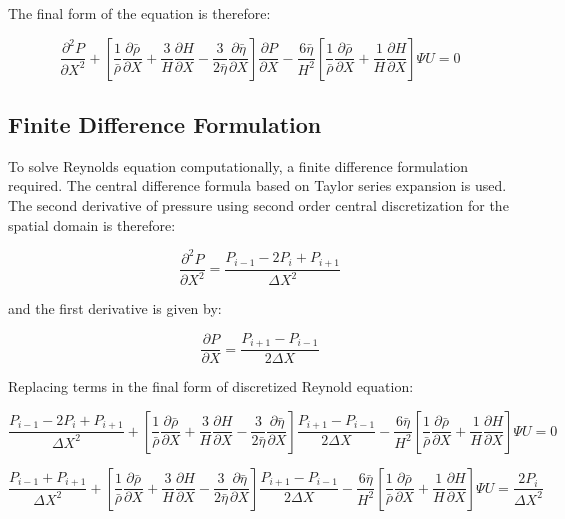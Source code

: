 The final form of the equation is therefore:

\begin{equation}\label{eq3.14}
	\frac{\partial^{2} P}{\partial X^{2}}+\left[\frac{1}{\bar{\rho}} \frac{\partial \bar{\rho}}{\partial X}+\frac{3}{H} \frac{\partial H}{\partial X}-\frac{3}{2 \bar{\eta}} \frac{\partial \bar{\eta}}{\partial X}\right] \frac{\partial P}{\partial X}-\frac{6 \bar{\eta}}{H^{2}}\left[\frac{1}{\bar{\rho}} \frac{\partial \bar{\rho}}{\partial X}+\frac{1}{H} \frac{\partial H}{\partial X}\right] \Psi U=0
\end{equation}

\subsection{Finite Difference Formulation} \label{Finite Difference Formulation}

To solve Reynolds equation computationally, a finite difference formulation required. The central difference formula based on Taylor series expansion \cite{Hoffmann2000} is used. The second derivative of pressure using second order central discretization for the spatial domain is therefore:

\begin{equation}\label{eq3.15}
	\frac{\partial^2 P}{\partial X^2}=\frac{P_{i-1}-2 P_i+P_{i+1}}{\Delta X^2}
\end{equation}

and the first derivative is given by:

\begin{equation}\label{eq3.16}
	\frac{\partial P}{\partial X}=\frac{P_{i+1}-P_{i-1}}{2 \Delta X}
\end{equation}

Replacing terms in the final form of discretized Reynold equation:

\begin{equation}\label{eq3.17}
	\frac{P_{i-1}-2 P_i+P_{i+1}}{\Delta X^2}+\left[\frac{1}{\bar{\rho}} \frac{\partial \bar{\rho}}{\partial X}+\frac{3}{H} \frac{\partial H}{\partial X}-\frac{3}{2 \bar{\eta}} \frac{\partial \bar{\eta}}{\partial X}\right] \frac{P_{i+1}-P_{i-1}}{2 \Delta X}-\frac{6 \bar{\eta}}{H^2}\left[\frac{1}{\bar{\rho}} \frac{\partial \bar{\rho}}{\partial X}+\frac{1}{H} \frac{\partial H}{\partial X}\right] \Psi U=0
\end{equation}

\begin{equation}\label{eq3.18}
	\frac{P_{i-1}+P_{i+1}}{\Delta X^2}+\left[\frac{1}{\bar{\rho}} \frac{\partial \bar{\rho}}{\partial X}+\frac{3}{H} \frac{\partial H}{\partial X}-\frac{3}{2 \bar{\eta}} \frac{\partial \bar{\eta}}{\partial X}\right] \frac{P_{i+1}-P_{i-1}}{2 \Delta X}-\frac{6 \bar{\eta}}{H^2}\left[\frac{1}{\bar{\rho}} \frac{\partial \bar{\rho}}{\partial X}+\frac{1}{H} \frac{\partial H}{\partial X}\right] \Psi U=\frac{2 P_i}{\Delta X^2}
\end{equation}

